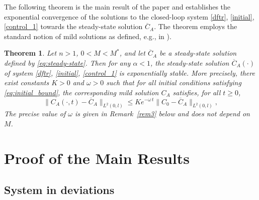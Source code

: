 \documentclass{mpi2015-cscpreprint}
\newtheorem{theorem}{Theorem}[section]
\numberwithin{equation}{section}
\begin{document}
The following theorem is the main result of the paper and establishes the exponential convergence of the solutions to the closed-loop system \eqref{dftr}, \eqref{initial}, \eqref{control_1} towards the steady-state solution $\overline{C}_A$.
The theorem  employs the standard notion of mild solutions as defined, e.g., in \cite[Definition 5.1.4, Section 5]{CurZwa2020}).
\begin{theorem}\label{th2}
Let $n>1$, $0<M<M^*$, and let $\overline{C}_A$ be a steady-state solution defined by \eqref{eq:steady-state}. Then for any $\alpha<1$, the steady-state solution $\overline{C}_A(\cdot)$ of system \eqref{dftr}, \eqref{initial}, \eqref{control_1} is  exponentially stable. More precisely, there exist constants $K>0$ and $\omega>0$ such that for all initial conditions satisfying \eqref{eq:initial_bound}, the corresponding mild solution $C_A$ satisfies, for all $t\geqslant0$,
\begin{equation}\label{eq:exp_estimate_for_C}
\|C_A(\cdot,t)-\overline{C}_A\|_{L^2(0,l)}\leqslant K e^{-\omega\,t}\|C_0-\overline{C}_A\|_{L^2(0,l)},
\end{equation}
The precise value of $\omega$ is given in  Remark~\ref{rem3} below { and does not depend on $M$}.
\end{theorem}

\section{Proof of the Main Results}\label{sec:main_proof}

\subsection{System in deviations}\label{sec:system_in_deviations}
\end{document}
